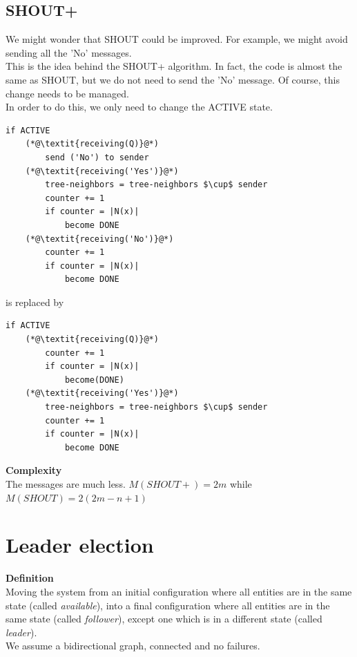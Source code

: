 \documentclass[paper=a4, fontsize=11pt]{scrartcl} %
\numberwithin{equation}{section} %
\numberwithin{figure}{section} %
\numberwithin{table}{section} %
\begin{document}
\subsection*{SHOUT+}
We might wonder that SHOUT could be improved. For example, we might avoid sending all the 'No' messages.
\\ This is the idea behind the SHOUT+ algorithm. In fact, the code is almost the same as SHOUT, but we do not need to send the 'No' message. Of course, this change needs to be managed.\\
In order to do this, we only need to change the ACTIVE state.
\begin{lstlisting}
if ACTIVE
	(*@\textit{receiving(Q)}@*)
		send ('No') to sender
	(*@\textit{receiving('Yes')}@*)
		tree-neighbors = tree-neighbors $\cup$ sender
		counter += 1
		if counter = |N(x)|
			become DONE
	(*@\textit{receiving('No')}@*)
		counter += 1
		if counter = |N(x)|
			become DONE	
\end{lstlisting}
is replaced by 
\begin{lstlisting}
if ACTIVE
	(*@\textit{receiving(Q)}@*)
		counter += 1
		if counter = |N(x)|
			become(DONE)
	(*@\textit{receiving('Yes')}@*)
		tree-neighbors = tree-neighbors $\cup$ sender
		counter += 1
		if counter = |N(x)|
			become DONE
\end{lstlisting}
\textbf{Complexity} \\
The messages are much less. 
$M(SHOUT+) = 2m$ while $M(SHOUT) = 2(2m -n+1)$

\clearpage
\section*{Leader election}
\textbf{Definition} \\
Moving the system from an initial configuration where all entities are in the same state (called \textit{available}), into a final configuration where all entities are in the same state (called \textit{follower}), except one which is in a different state (called \textit{leader}).\\
We assume a bidirectional graph, connected and no failures.\\
\end{document}
